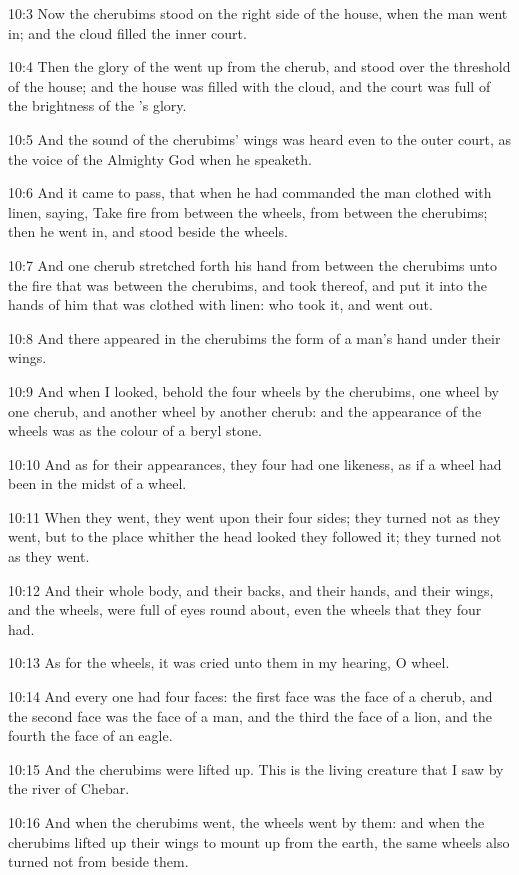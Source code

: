 10:3 Now the cherubims stood on the right side of the house, when the man went in; and the cloud filled the inner court.

10:4 Then the glory of the \LORD went up from the cherub, and stood over the threshold of the house; and the house was filled with the cloud, and the court was full of the brightness of the \LORD's glory.

10:5 And the sound of the cherubims' wings was heard even to the outer court, as the voice of the Almighty God when he speaketh.

10:6 And it came to pass, that when he had commanded the man clothed with linen, saying, Take fire from between the wheels, from between the cherubims; then he went in, and stood beside the wheels.

10:7 And one cherub stretched forth his hand from between the cherubims unto the fire that was between the cherubims, and took thereof, and put it into the hands of him that was clothed with linen: who took it, and went out.

10:8 And there appeared in the cherubims the form of a man's hand under their wings.

10:9 And when I looked, behold the four wheels by the cherubims, one wheel by one cherub, and another wheel by another cherub: and the appearance of the wheels was as the colour of a beryl stone.

10:10 And as for their appearances, they four had one likeness, as if a wheel had been in the midst of a wheel.

10:11 When they went, they went upon their four sides; they turned not as they went, but to the place whither the head looked they followed it; they turned not as they went.

10:12 And their whole body, and their backs, and their hands, and their wings, and the wheels, were full of eyes round about, even the wheels that they four had.

10:13 As for the wheels, it was cried unto them in my hearing, O wheel.

10:14 And every one had four faces: the first face was the face of a cherub, and the second face was the face of a man, and the third the face of a lion, and the fourth the face of an eagle.

10:15 And the cherubims were lifted up. This is the living creature that I saw by the river of Chebar.

10:16 And when the cherubims went, the wheels went by them: and when the cherubims lifted up their wings to mount up from the earth, the same wheels also turned not from beside them.

